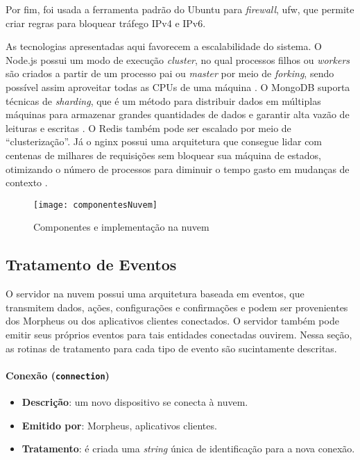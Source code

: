 Por fim, foi usada a ferramenta padrão do Ubuntu para \emph{firewall}, ufw, que permite criar regras para bloquear tráfego IPv4 e IPv6.

As tecnologias apresentadas aqui favorecem a escalabilidade do sistema. O Node.js possui um modo de execução \emph{cluster}, no qual processos filhos ou \emph{workers} são criados a partir de um processo pai ou \emph{master} por meio de \emph{forking}, sendo possível assim aproveitar todas as CPUs de uma máquina \cite{nodejscluster}. O MongoDB suporta técnicas de \emph{sharding}, que é um método para distribuir dados em múltiplas máquinas para armazenar grandes quantidades de dados e garantir alta vazão de leituras e escritas \cite{mongodbsharding}. O Redis também pode ser escalado por meio de ``clusterização''. Já o nginx possui uma arquitetura que consegue lidar com centenas de milhares de requisições sem bloquear sua máquina de estados, otimizando o número de processos para diminuir o tempo gasto em mudanças de contexto \cite{nginxscalability}.

\begin{figure}[H]
	\centering
	\caption{Componentes e implementação na nuvem}
  \texttt{[image: componentesNuvem]}
\label{fig:componentesNuvem}
\end{figure}

\subsection{Tratamento de Eventos}

O servidor na nuvem possui uma arquitetura baseada em eventos, que transmitem dados, ações, configurações e confirmações e podem ser provenientes dos Morpheus ou dos aplicativos clientes conectados. O servidor também pode emitir seus próprios eventos para tais entidades conectadas ouvirem. Nessa seção, as rotinas de tratamento para cada tipo de evento são sucintamente descritas.

\paragraph{Conexão (\texttt{connection})}
\begin{itemize}
\item \textbf{Descrição}: um novo dispositivo se conecta à nuvem.
\item \textbf{Emitido por}: Morpheus, aplicativos clientes.
\item \textbf{Tratamento}: é criada uma \emph{string} única de identificação para a nova conexão.
\end{itemize}

